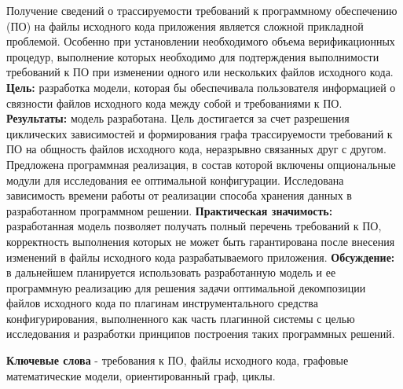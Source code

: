 

Получение сведений о трассируемости требований к программному обеспечению (ПО) на файлы исходного кода приложения является сложной прикладной проблемой. Особенно при установлении необходимого объема верификационных процедур, выполнение которых необходимо для подтерждения выполнимости требований к ПО при изменении одного или нескольких файлов исходного кода. \textbf{Цель:} разработка модели, которая бы обеспечивала пользователя информацией о связности файлов исходного кода между собой и требованиями к ПО. \textbf{Результаты:} модель разработана. Цель достигается за счет разрешения циклических зависимостей и формирования графа трассируемости требований к ПО на общность файлов исходного кода, неразрывно связанных друг с другом. Предложена программная реализация, в состав которой включены опциональные модули для исследования ее оптимальной конфигурации. Исследована зависимость времени работы от реализации способа хранения данных в разработанном программном решении. \textbf{Практическая значимость:} разработанная модель позволяет получать полный перечень требований к ПО, корректность выполнения которых не может быть гарантирована после внесения изменений в файлы исходного кода разрабатываемого приложения. \textbf{Обсуждение:} в дальнейшем планируется использовать разработанную модель и ее программную реализацию для решения задачи оптимальной декомпозиции файлов исходного кода по плагинам инструментального средства конфигурирования, выполненного как часть плагинной системы с целью исследования и разработки принципов построения таких программных решений.

\textbf{Ключевые слова} - требования к ПО, файлы исходного кода, графовые математические модели, ориентированный граф, циклы.